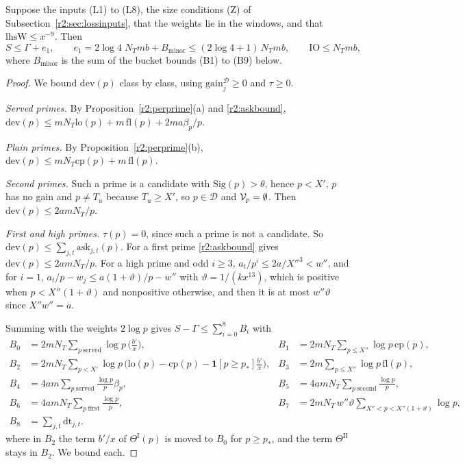 \begin{theorem}\label{r2:A1}
Suppose the inputs (L1) to (L8), the size conditions (Z) of Subsection~\ref{r2:sec:lossinputs}, that the weights lie in the windows, and that $\mathrm{lhsW}\le x^{-9}$. Then
\[
S\le\Gamma+e_1,\qquad e_1=2\log4\;N_Tmb+B_{\mathrm{minor}}\le(2\log4+1)\,N_Tmb,\qquad\mathrm{IO}\le N_Tmb,
\]
where $B_{\mathrm{minor}}$ is the sum of the bucket bounds (B1) to (B9) below.
\end{theorem}

\begin{proof}
We bound $\mathrm{dev}(p)$ class by class, using $\mathrm{gain}^{\mathcal D}_j\ge0$ and $\tau\ge0$.

\emph{Served primes.} By Proposition~\ref{r2:perprime}(a) and \eqref{r2:askbound}, $\mathrm{dev}(p)\le mN_T\mathrm{lo}(p)+m\,\mathrm{fl}(p)+2ma\beta_p/p$.

\emph{Plain primes.} By Proposition~\ref{r2:perprime}(b), $\mathrm{dev}(p)\le mN_T\mathrm{cp}(p)+m\,\mathrm{fl}(p)$.

\emph{Second primes.} Such a prime is a candidate with $\mathrm{Sig}(p)>\theta$, hence $p<X'$, $p$ has no gain and $p\ne T_u$ because $T_u\ge X'$, so $p\in\mathcal D$ and $\mathcal V_p=\emptyset$. Then $\mathrm{dev}(p)\le2amN_T/p$.

\emph{First and high primes.} $\tau(p)=0$, since such a prime is not a candidate. So $\mathrm{dev}(p)\le\sum_{j,t}\mathrm{ask}_{j,t}(p)$. For a first prime \eqref{r2:askbound} gives $\mathrm{dev}(p)\le2amN_T/p$. For a high prime and odd $i\ge3$, $a_t/p^i\le2a/X''^3<w''$, and for $i=1$, $a_t/p-w_j\le a(1+\vartheta)/p-w''$ with $\vartheta=1/(kx^{13})$, which is positive when $p<X''(1+\vartheta)$ and nonpositive otherwise, and then it is at most $w''\vartheta$ since $X''w''=a$.

Summing with the weights $2\log p$ gives $S-\Gamma\le\sum_{i=0}^{8}B_i$ with
\begin{align*}
B_0&=2mN_T\sum_{p\ \mathrm{served}}\log p\,\Big(\frac{b'}x\Big),&
B_1&=2mN_T\sum_{p\le X''}\log p\,\mathrm{cp}(p),\\
B_2&=2mN_T\sum_{p<X'}\log p\,\big(\mathrm{lo}(p)-\mathrm{cp}(p)-\mathbf 1[p\ge p_*]\tfrac{b'}x\big),&
B_3&=2m\sum_{p\le X''}\log p\,\mathrm{fl}(p),\\
B_4&=4am\sum_{p\ \mathrm{served}}\frac{\log p}p\beta_p,&
B_5&=4amN_T\sum_{p\ \mathrm{second}}\frac{\log p}p,\\
B_6&=4amN_T\sum_{p\ \mathrm{first}}\frac{\log p}p,&
B_7&=2mN_T\,w''\vartheta\sum_{X''<p<X''(1+\vartheta)}\log p,\\
B_8&=\sum_{j,t}\mathrm{dt}_{j,t}.
\end{align*}
where in $B_2$ the term $b'/x$ of $\Theta^{\mathrm I}(p)$ is moved to $B_0$ for $p\ge p_*$, and the term $\Theta^{\mathrm{II}}$ stays in $B_2$. We bound each.


\end{proof}
